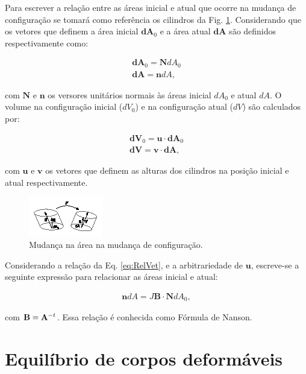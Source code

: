 \documentclass[tese_patricia]{subfiles}
\begin{document}
Para escrever a relação entre as áreas inicial e atual que ocorre na mudança de configuração se tomará como referência os cilindros da Fig. \ref{fig:DefArea}. Considerando que os vetores que definem a área inicial $\mathbf{dA}_{0} $ e a área atual $\mathbf{dA}$ são definidos respectivamente como:

\begin{align}
\mathbf{dA}_{0} = \mathbf{N}dA_{0}\\
\mathbf{dA} = \mathbf{n}dA \label{eq:areas},
\end{align}

\noindent com $\mathbf{N}$ e $\mathbf{n}$ os versores unitários normais às áreas inicial $dA_{0}$ e atual $dA$. O volume na configuração inicial ($dV_{0}$) e na configuração atual ($dV$) são calculados por:

\begin{align}
\mathbf{dV}_{0} = \mathbf{u} \cdot \mathbf{dA}_{0}\\
\mathbf{dV} = \mathbf{v} \cdot \mathbf{dA} \label{eq:vol},
\end{align}

\noindent com $\mathbf{u}$ e $\mathbf{v}$ os vetores que definem as alturas dos cilindros na posição inicial e atual respectivamente.

\begin{figure}[htb!]
	\centering
	\includegraphics[scale=6.0,trim=0cm 0.2cm 0cm 0cm, clip=true]{Imagens/Cap4/DefArea.eps}	
	\caption{Mudança na área na mudança de configuração.}
	\label{fig:DefArea}
\end{figure}

Considerando a relação da Eq. \eqref{eq:RelVet}, e a arbitrariedade de $\mathbf{u}$, escreve-se a seguinte expressão para relacionar as áreas inicial e atual:

\begin{align}
\mathbf{n}dA = J \mathbf{B} \cdot \mathbf{N} dA_{0}, \label{eq:Nanson}
\end{align}

\noindent com $\mathbf{B} = \mathbf{A}^{-t}$. Essa relação é conhecida como Fórmula de Nanson.

\section{Equilíbrio de corpos deformáveis} \label{sec:Equilibrio}
\end{document}
